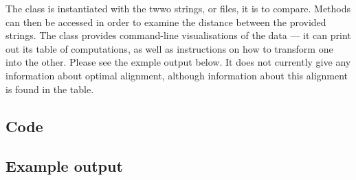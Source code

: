 \documentclass[a4paper,11pt,twoside,notitlepage]{article}
\begin{document}
\begin{appendices}
          The class is instantiated with the twwo strings, or files,
          it is to compare. Methods can then be accessed in order to
          examine the distance between the provided strings. The class
          provides command-line visualisations of the data --- it can
          print out its table of computations, as well as instructions
          on how to transform one into the other. Please see the
          exmple output below. It does not currently give any
          information about optimal alignment, although information
          about this alignment is found in the table.
          \subsection{Code}
          
          \subsection{Example output}
        \end{appendices}
        
\end{document}
